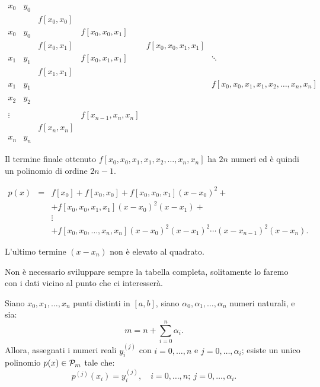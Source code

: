$\begin{array}{llllll}
x_0 & y_0   &   \\
    &     & f[x_0,x_0] \\
x_0 & y_0  &            & f[x_0,x_0,x_1]  \\
    &     & f[x_0,x_1] &               & f[x_0,x_0,x_1,x_1]\\
x_1 & y_1 &            & f[x_0,x_1,x_1] &                  & \ddots \\
    &     & f[x_1,x_1]\\
x_1 & y_1 &            & & & f[x_0,x_0,x_1,x_1,x_2, \ldots, x_n,x_n]\\
    &     & \\
x_2 & y_2 & \\
    &     &          &                    & \\
\vdots & &           & f[x_{n-1}, x_n, x_n]\\
    &    & f[x_n,x_n]\\
x_n & y_n
\end{array}$
\begin{flushleft}
Il termine finale ottenuto $f[x_0,x_0,x_1,x_1,x_2, \ldots, x_n,x_n]$ ha
$2n$ numeri ed è quindi un polinomio di ordine $2n-1$.
\end{flushleft}
\[
\begin{array}{lcl}
p(x) & = & f[x_0] + f[x_0,x_0] + f[x_0,x_0,x_1](x-x_0)^2 +\\
     &   & + f[x_0,x_0,x_1,x_1](x-x_0)^2(x-x_1) + \\
     &  & \vdots\\
     &   &+ f[x_0,x_0, \ldots, x_n,x_n](x-x_0)^2(x-x_1)^2\cdots
(x-x_{n-1})^2 (x-x_n).
\end{array}
\]
\begin{notabene}
L'ultimo termine $(x-x_n)$ non è elevato al quadrato.
\end{notabene}

\begin{osse}
Non è necessario sviluppare sempre la tabella completa, solitamente lo
faremo con i dati vicino al punto che ci interesserà.
\end{osse}

\begin{prop}
Siano $x_0, x_1, \ldots, x_n$ punti distinti in $[a,b]$, siano $\alpha_0,
\alpha_1, \ldots, \alpha_n$ numeri naturali, e sia:
\[m = n + \sum_{i=0}^n\alpha_i.\]
Allora, assegnati i numeri reali $y^{(j)}_i$ con $i = 0, \ldots, n$ e $j = 0,
\ldots, \alpha_i$; esiste un unico polinomio $p(x) \in \mathcal{P}_m$ tale che:
\[
p^{(j)}(x_i) = y^{(j)}_i, \quad i = 0, \ldots, n; \ j= 0, \ldots, \alpha_i.
\]
\end{prop}

